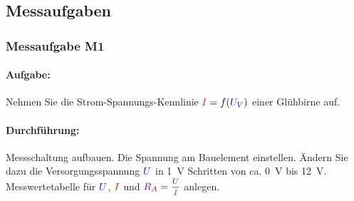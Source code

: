 \documentclass[11pt,a4paper,titlepage,parskip=half]{scrreprt}
\begin{document}
          \subsection{Messaufgaben}
            \subsubsection{Messaufgabe M1}
              \paragraph{Aufgabe:} Nehmen Sie die Strom-Spannungs-Kennlinie $\textcolor{red}{I} = f(\textcolor{blue}{U_V})$ einer Glühbirne auf.
              \paragraph{Durchführung:} Messschaltung aufbauen. Die Spannung  am Bauelement einstellen. Ändern Sie
              dazu die Versorgungsspannung $\textcolor{blue}{U}$ in \SI{1}{\volt} Schritten von ca. \SI{0}{\volt} bis \SI{12}{\volt}.
              Messwertetabelle für $\textcolor{blue}{U}$, $\textcolor{red}{I}$ und $\widerstand{R_A} = \mfrac{\spannung{U}}{\strom{I}}$ anlegen.
\end{document}
